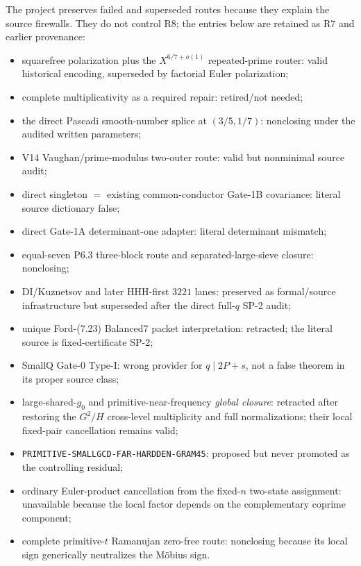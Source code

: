 \documentclass[11pt]{article}
\theoremstyle{definition}
\newcommand{\1}{\mathbf 1}
\begin{document}
The project preserves failed and superseded routes because they explain the source
firewalls.  They do not control R8; the entries below are retained as R7 and earlier provenance:
\begin{itemize}[leftmargin=1.6em]
\item squarefree polarization plus the $X^{6/7+o(1)}$ repeated-prime router:
  valid historical encoding, superseded by factorial Euler polarization;
\item complete multiplicativity as a required repair: retired/not needed;
\item the direct Pascadi smooth-number splice at $(3/5,1/7)$: nonclosing under the audited
  written parameters;
\item V14 Vaughan/prime-modulus two-outer route: valid but nonminimal source audit;
\item direct singleton $=$ existing common-conductor Gate-1B covariance: literal source
  dictionary false;
\item direct Gate-1A determinant-one adapter: literal determinant mismatch;
\item equal-seven P6.3 three-block route and separated-large-sieve closure: nonclosing;
\item DI/Kuznetsov and later HHH-first $3221$ lanes: preserved as formal/source
  infrastructure but superseded after the direct full-$q$ SP-2 audit;
\item unique Ford-(7.23) Balanced7 packet interpretation: retracted; the literal source is
  fixed-certificate SP-2;
\item SmallQ Gate-0 Type-I: wrong provider for $q\mid2P+s$, not a false theorem in its
  proper source class;
\item large-shared-$g_0$ and primitive-near-frequency \emph{global closure}: retracted
  after restoring the $G^2/H$ cross-level multiplicity and full normalizations; their local
  fixed-pair cancellation remains valid;
\item \texttt{PRIMITIVE-SMALLGCD-FAR-HARDDEN-GRAM45}: proposed but never promoted as the
  controlling residual;
\item ordinary Euler-product cancellation from the fixed-$n$ two-state assignment:
  unavailable because the local factor depends on the complementary coprime component;
\item complete primitive-$t$ Ramanujan zero-free route:
  nonclosing because its local sign generically neutralizes the M\"obius sign.
\end{itemize}
\end{document}

